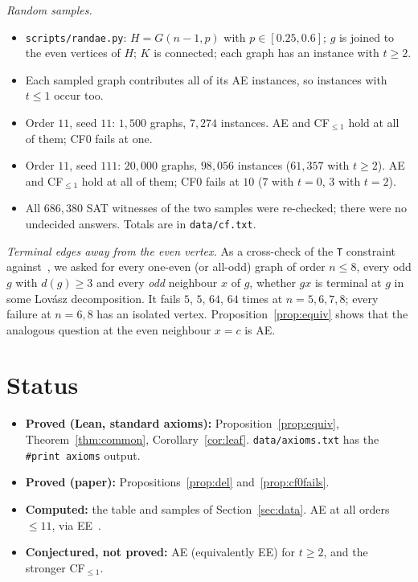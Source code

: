 \documentclass[11pt]{amsart}
\theoremstyle{definition}
\begin{document}
\emph{Random samples.}
\begin{itemize}
\item \texttt{scripts/randae.py}: $H=G(n-1,p)$ with $p\in[0.25,0.6]$; $g$ is joined to the even
vertices of $H$; $K$ is connected; each graph has an instance with $t\ge2$.
\item Each sampled graph contributes all of its AE instances, so instances with $t\le1$ occur too.
\item Order $11$, seed $11$: $1{,}500$ graphs, $7{,}274$ instances. AE and CF$_{\le1}$ hold at all
of them; CF0 fails at one.
\item Order $11$, seed $111$: $20{,}000$ graphs, $98{,}056$ instances ($61{,}357$ with $t\ge2$). AE
and CF$_{\le1}$ hold at all of them; CF0 fails at $10$ ($7$ with $t=0$, $3$ with $t=2$).
\item All $686{,}380$ SAT witnesses of the two samples were re-checked; there were no undecided
answers. Totals are in \texttt{data/cf.txt}.
\end{itemize}

\emph{Terminal edges away from the even vertex.} As a cross-check of the \texttt{T} constraint
against~\cite[Proposition~3.1]{PE}, we asked for every one-even (or all-odd) graph of order
$n\le8$, every odd $g$ with $d(g)\ge3$ and every \emph{odd} neighbour $x$ of $g$, whether $gx$ is
terminal at $g$ in some Lov\'asz decomposition. It fails $5$, $5$, $64$, $64$ times at $n=5,6,7,8$; every failure at
$n=6,8$ has an isolated vertex. Proposition~\ref{prop:equiv} shows that the analogous
question at the even neighbour $x=c$ is AE.

\section{Status}

\begin{itemize}
\item \textbf{Proved (Lean, standard axioms):} Proposition~\ref{prop:equiv}, Theorem~\ref{thm:common},
Corollary~\ref{cor:leaf}. \texttt{data/axioms.txt} has the \texttt{\#print axioms} output.
\item \textbf{Proved (paper):} Propositions~\ref{prop:del} and~\ref{prop:cf0fails}.
\item \textbf{Computed:} the table and samples of Section~\ref{sec:data}. AE at all orders
$\le11$, via EE~\cite{PE}.
\item \textbf{Conjectured, not proved:} AE (equivalently EE) for $t\ge2$, and the stronger
CF$_{\le1}$.
\end{itemize}
\end{document}
